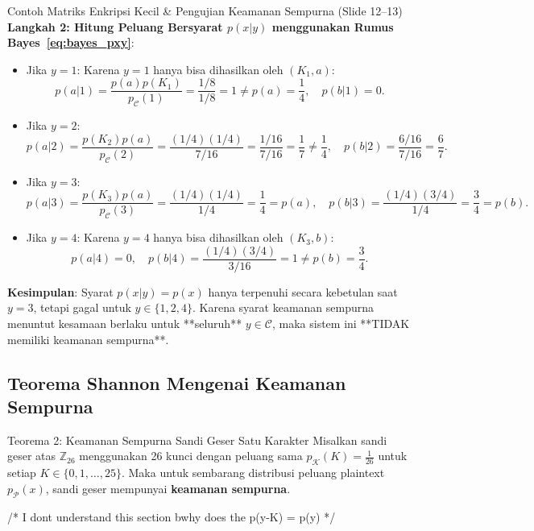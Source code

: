 \documentclass[11pt,a4paper]{article}
\begin{document}
\begin{examplebox}{Contoh Matriks Enkripsi Kecil \& Pengujian Keamanan Sempurna (Slide 12--13)}
\vspace{0.2em}
\noindent\textbf{Langkah 2: Hitung Peluang Bersyarat $p(x|y)$ menggunakan Rumus Bayes~\eqref{eq:bayes_pxy}}:
\begin{itemize}
    \item Jika $y = 1$: Karena $y=1$ hanya bisa dihasilkan oleh $(K_1, a)$:
    \[
    p(a|1) = \frac{p(a)p(K_1)}{p_{\mathcal{C}}(1)} = \frac{1/8}{1/8} = 1 \neq p(a) = \frac{1}{4}, \quad p(b|1) = 0.
    \]
    \item Jika $y = 2$:
    \[
    p(a|2) = \frac{p(K_2)p(a)}{p_{\mathcal{C}}(2)} = \frac{(1/4)(1/4)}{7/16} = \frac{1/16}{7/16} = \frac{1}{7} \neq \frac{1}{4}, \quad p(b|2) = \frac{6/16}{7/16} = \frac{6}{7}.
    \]
    \item Jika $y = 3$:
    \[
    p(a|3) = \frac{p(K_3)p(a)}{p_{\mathcal{C}}(3)} = \frac{(1/4)(1/4)}{1/4} = \frac{1}{4} = p(a), \quad p(b|3) = \frac{(1/4)(3/4)}{1/4} = \frac{3}{4} = p(b).
    \]
    \item Jika $y = 4$: Karena $y=4$ hanya bisa dihasilkan oleh $(K_3, b)$:
    \[
    p(a|4) = 0, \quad p(b|4) = \frac{(1/4)(3/4)}{3/16} = 1 \neq p(b) = \frac{3}{4}.
    \]
\end{itemize}
\textbf{Kesimpulan}: Syarat $p(x|y) = p(x)$ hanya terpenuhi secara kebetulan saat $y = 3$, tetapi gagal untuk $y \in \{1, 2, 4\}$. Karena syarat keamanan sempurna menuntut kesamaan berlaku untuk **seluruh** $y \in \mathcal{C}$, maka sistem ini **TIDAK memiliki keamanan sempurna**.
\end{examplebox}

\subsection{Teorema Shannon Mengenai Keamanan Sempurna}

\begin{thmbox}{Teorema 2: Keamanan Sempurna Sandi Geser Satu Karakter}
Misalkan sandi geser atas $\mathbb{Z}_{26}$ menggunakan 26 kunci dengan peluang sama $p_{\mathcal{K}}(K) = \frac{1}{26}$ untuk setiap $K \in \{0, 1, \dots, 25\}$. Maka untuk sembarang distribusi peluang plaintext $p_{\mathcal{P}}(x)$, sandi geser mempunyai \textbf{keamanan sempurna}.
\end{thmbox}

/* I dont understand this section bwhy does the p(y-K) = p(y) */
\end{document}
